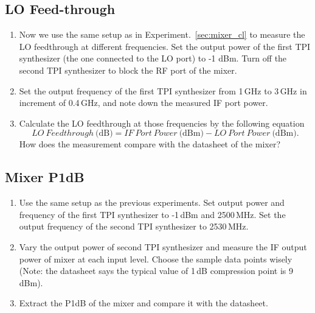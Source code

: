 \documentclass[letterpaper, 11pt]{article}
\begin{document}
\subsection{LO Feed-through}

\begin{enumerate}
	\item Now we use the same setup as in Experiment.~\ref{sec:mixer_cl} to measure the LO feedthrough at different frequencies. Set the output power of the  first TPI synthesizer (the one connected to the LO port) to -1 dBm. Turn off the second TPI synthesizer to block the RF port of the mixer. 
	
	\item Set the output frequency of the first TPI synthesizer from 1\,GHz to 3\,GHz in increment of 0.4\,GHz, and note down the measured IF port power. 

	\item Calculate the LO feedthrough at those frequencies by the following equation
	\[
		LO~Feedthrough~\text{(dB)} = IF~Port~Power~\text{(dBm)} - LO~Port~Power~\text{(dBm)}.
	\]
		How does the measurement compare with the datasheet of the mixer?
	
\end{enumerate}

\subsection{Mixer P1dB}

\begin{enumerate}
	\item Use the same setup as the previous experiments. Set output power and frequency of the first TPI synthesizer to -1\,dBm and 2500\,MHz. Set the output frequency of the second TPI synthesizer to 2530\,MHz. 

	\item Vary the output power of second TPI synthesizer and measure the IF output power of mixer at each input level. Choose the sample data points wisely (Note: the datasheet says the typical value of 1\,dB compression point is 9\,dBm). 

	\item Extract the P1dB of the mixer and compare it with the datasheet. 

\end{enumerate}


%
% 
%
%
%
\end{document}
